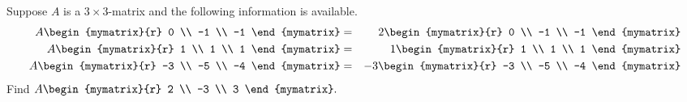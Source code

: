 \begin{enumialphparenastyle}
\begin{ex} Suppose $A$ is a $3\times 3$-matrix and the following information is
available.
\begin{eqnarray*}
A\begin{mymatrix}{r}
0 \\
-1 \\
-1
\end{mymatrix} &=&2\begin{mymatrix}{r}
0 \\
-1 \\
-1
\end{mymatrix} \\
A\begin{mymatrix}{r}
1 \\
1 \\
1
\end{mymatrix} &=& 1\begin{mymatrix}{r}
1 \\
1 \\
1
\end{mymatrix} \\
A\begin{mymatrix}{r}
-3 \\
-5 \\
-4
\end{mymatrix} &=&-3\begin{mymatrix}{r}
-3 \\
-5 \\
-4
\end{mymatrix}
\end{eqnarray*}
Find $A\begin{mymatrix}{r}
2 \\
-3 \\
3
\end{mymatrix}. $ \vspace{1mm}
\end{ex}

\end{enumialphparenastyle}